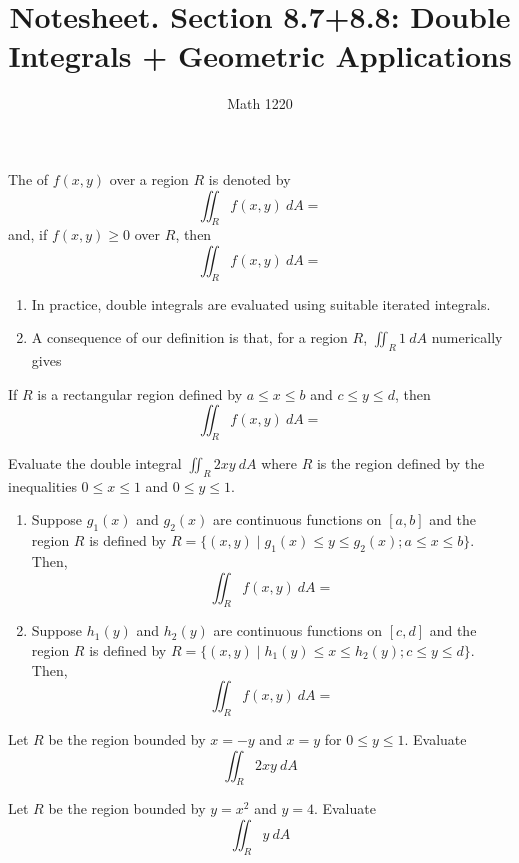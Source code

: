 \documentclass[12pt, a4paper]{article}
\author{Math 1220}
\title{Notesheet. Section 8.7+8.8: Double Integrals + Geometric Applications}
\date{}
\begin{document}
\maketitle
\nameline
\begin{defi}
  The  of \(f(x,y)\) over a region \(R\) is
  denoted by \[
    \iint_R f(x,y)\ dA = 
  \]
  and, if \(f(x,y) \geq 0\) over \(R\), then \[
    \iint_R f(x,y)\ dA = 
  \]
\end{defi}
\begin{rmk}
  \begin{enumerate}
  \item In practice, double integrals are evaluated using suitable iterated
  integrals. 
  \item A consequence of our definition is that, for a region \(R\),
    \(\iint_R 1\ dA\) numerically gives
  \end{enumerate}
\end{rmk}
\begin{thrm}
  If \(R\) is a rectangular region defined by \(a \leq x \leq b\) and
  \(c \leq y \leq d\), then \[
    \iint_R f(x,y)\ dA = 
  \]
\end{thrm}
\begin{ex}
  Evaluate the double integral \(\iint_R 2xy \ dA\) where \(R\) is
  the region defined by the inequalities \(0 \leq x \leq 1\) and \(0
  \leq y \leq 1\).
\end{ex}
\begin{thrm}
  \begin{enumerate}
  \item   Suppose \(g_1(x)\) and \(g_2(x)\) are continuous functions on
  \([a,b]\) and the region \(R\) is defined by \(R = \{(x,y) \mid
  g_1(x) \leq y \leq g_2(x); a \leq x \leq b\}\). Then, \[
    \iint_R f(x,y)\ dA = 
  \]
  \item Suppose \(h_1(y)\) and \(h_2(y)\) are continuous functions on
    \([c,d]\) and the region \(R\) is defined by \(R = \{(x,y) \mid
    h_1(y) \leq x \leq h_2(y); c \leq y \leq d\}\). Then, \[
      \iint_R f(x,y)\ dA = 
    \]
  \end{enumerate}
\end{thrm}
\begin{ex}
  Let \(R\) be the region bounded by \(x=-y\) and \(x=y\) for \(0 \leq
  y \leq 1\). Evaluate \[
    \iint_R 2xy\ dA
  \]
\end{ex}
\begin{ex}
  Let \(R\) be the region bounded by \(y=x^2\) and
  \(y=4\). Evaluate \[
    \iint_R y\ dA
  \]
\end{ex}
\end{document}
